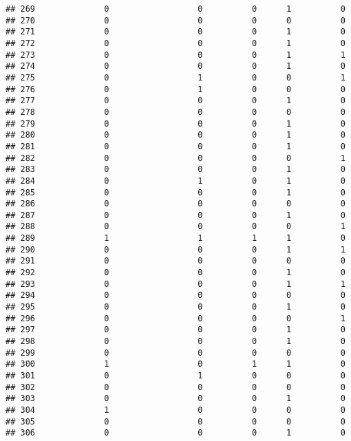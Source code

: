 \documentclass[
]{article}
\begin{document}
\begin{verbatim}
## 269              0                  0          0      1          0
## 270              0                  0          0      0          0
## 271              0                  0          0      1          0
## 272              0                  0          0      1          0
## 273              0                  0          0      1          1
## 274              0                  0          0      1          0
## 275              0                  1          0      0          1
## 276              0                  1          0      0          0
## 277              0                  0          0      1          0
## 278              0                  0          0      0          0
## 279              0                  0          0      1          0
## 280              0                  0          0      1          0
## 281              0                  0          0      1          0
## 282              0                  0          0      0          1
## 283              0                  0          0      1          0
## 284              0                  1          0      1          0
## 285              0                  0          0      1          0
## 286              0                  0          0      0          0
## 287              0                  0          0      1          0
## 288              0                  0          0      0          1
## 289              1                  1          1      1          0
## 290              0                  0          0      1          1
## 291              0                  0          0      0          0
## 292              0                  0          0      1          0
## 293              0                  0          0      1          1
## 294              0                  0          0      0          0
## 295              0                  0          0      1          0
## 296              0                  0          0      0          1
## 297              0                  0          0      1          0
## 298              0                  0          0      1          0
## 299              0                  0          0      0          0
## 300              1                  0          1      1          0
## 301              0                  1          0      0          0
## 302              0                  0          0      0          0
## 303              0                  0          0      1          0
## 304              1                  0          0      0          0
## 305              0                  0          0      0          0
## 306              0                  0          0      1          0

\end{verbatim}
\end{document}
